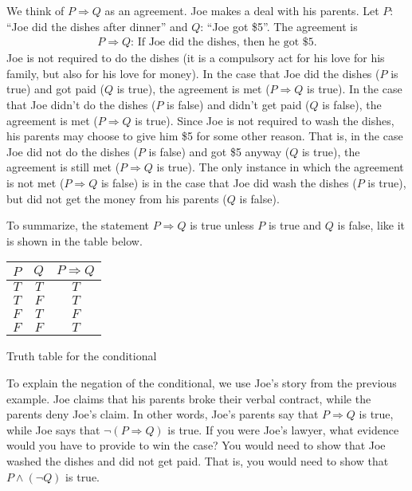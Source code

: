 \begin{example}
We think of $P \Rightarrow Q$ as an agreement. Joe makes a deal with his parents. Let $P$: ``Joe did the dishes after dinner'' and $Q$: ``Joe got \$5''. The agreement is
	\begin{align*}
	P \Rightarrow Q : \, \text{If Joe did the dishes, then he got \$5.}
	\end{align*}
Joe is not required to do the dishes (it is a compulsory act for his love for his family, but also for his love for money). In the case that Joe did the dishes ($P$ is true) and got paid ($Q$ is true), the agreement is met ($P \Rightarrow Q$ is true). In the case that Joe didn't do the dishes ($P$ is false) and didn't get paid ($Q$ is false), the agreement is met ($P \Rightarrow Q$ is true). Since Joe is not required to wash the dishes, his parents may choose to give him \$5 for some other reason. That is, in the case Joe did not do the dishes ($P$ is false) and got \$5 anyway ($Q$ is true), the agreement is still met ($P \Rightarrow Q$ is true). The only instance in which the agreement is not met ($P \Rightarrow Q$ is false) is in the case that Joe did wash the dishes ($P$ is true), but did not get the money from his parents ($Q$ is false).
\end{example}

To summarize, the statement $P \Rightarrow Q$ is true unless $P$ is true and $Q$ is false, like it is shown in the table below.

	\begin{center}
		\begin{tabular}{c|c|c}
		$P$ & $Q$ & $P \Rightarrow Q$ \\\hline 
		$T$ & $T$ & $T$ \\\hline 
		$T$ & $F$ & $T$ \\\hline 
		$F$ & $T$ & $F$ \\\hline 
		$F$ & $F$ & $T$ \\
		\end{tabular}\vspace*{4pt}

		Truth table for the conditional
	\end{center}

To explain the negation of the conditional, we use Joe's story from the previous example. Joe claims that his parents broke their verbal contract, while the parents deny Joe's claim. In other words, Joe's parents say that $P \Rightarrow Q$ is true, while Joe says that $\neg (P \Rightarrow Q)$ is true. If you were Joe's lawyer, what evidence would you have to provide to win the case? You would need to show that Joe washed the dishes and did not get paid. That is, you would need to show that $P \wedge (\neg Q)$ is true.

